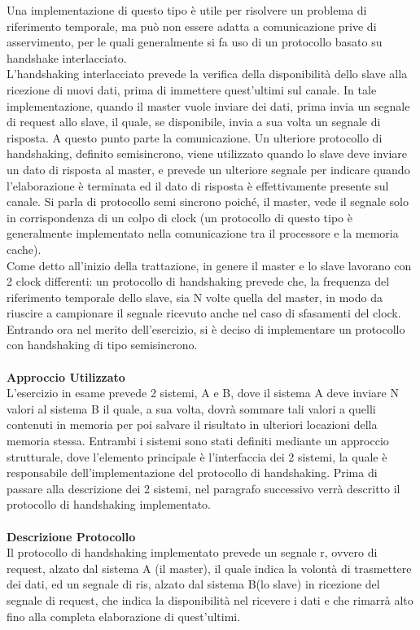 \documentclass[12pt]{article}
\begin{document}
Una implementazione di questo tipo è utile per risolvere un problema di riferimento temporale, ma può non essere adatta a comunicazione prive di asservimento, per le quali generalmente si fa uso di un protocollo basato su handshake interlacciato.
\\L’handshaking interlacciato prevede la verifica della disponibilità dello slave alla ricezione di nuovi dati, prima di immettere quest’ultimi sul canale. In tale implementazione, quando il master vuole inviare dei dati, prima invia un segnale di request allo slave, il quale, se disponibile, invia a sua volta un segnale di risposta. A questo punto parte la comunicazione.
Un ulteriore protocollo di handshaking, definito semisincrono, viene utilizzato quando lo slave deve inviare un dato di risposta al master, e prevede un ulteriore segnale per indicare quando l’elaborazione è terminata ed il dato di risposta è effettivamente presente sul canale. Si parla di protocollo semi sincrono poiché, il master, vede il segnale solo in corrispondenza di un colpo di clock (un protocollo di questo tipo è generalmente implementato nella comunicazione tra il processore e la memoria cache).
\\Come detto all’inizio della trattazione, in genere il master e lo slave lavorano con 2 clock differenti: un protocollo di handshaking prevede che, la frequenza del riferimento temporale dello slave, sia N volte quella del master, in modo da riuscire a campionare il segnale ricevuto anche nel caso di sfasamenti del clock.
Entrando ora nel merito dell’esercizio, si è deciso di implementare un protocollo con handshaking di tipo semisincrono.
\\\\{\large \textbf{Approccio Utilizzato}}
\\L’esercizio in esame prevede 2 sistemi, A e B, dove il sistema A deve inviare N valori al sistema B il quale, a sua volta, dovrà sommare tali valori a quelli contenuti in memoria per poi salvare il risultato in ulteriori locazioni della memoria stessa.
Entrambi i sistemi sono stati definiti mediante un approccio strutturale, dove l’elemento principale è l’interfaccia dei 2 sistemi, la quale è responsabile dell’implementazione del protocollo di handshaking. Prima di passare alla descrizione dei 2 sistemi, nel paragrafo successivo verrà descritto il protocollo di handshaking implementato.
\\\\{\large \textbf{Descrizione Protocollo}}
\\Il protocollo di handshaking implementato prevede un segnale r, ovvero di request, alzato dal sistema A (il master), il quale indica la volontà di trasmettere dei dati, ed un segnale di ris, alzato dal sistema B(lo slave) in ricezione del segnale di request, che indica la disponibilità nel ricevere i dati e che rimarrà alto fino alla completa elaborazione di quest’ultimi.
\end{document}
